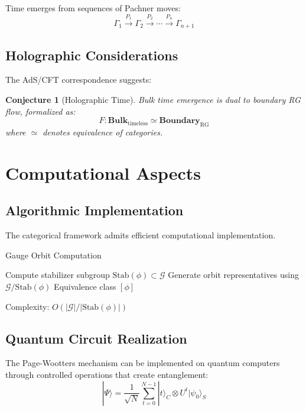 \documentclass[12pt,a4paper]{article}
\newtheorem{conjecture}[theorem]{Conjecture}
\newcommand{\GaugeGroup}{\mathcal{G}}
\newcommand{\Config}{\mathcal{C}}
\begin{document}
Time emerges from sequences of Pachner moves:
\[
\Gamma_1 \xrightarrow{P_1} \Gamma_2 \xrightarrow{P_2} \cdots \xrightarrow{P_n} \Gamma_{n+1}
\]

\subsection{Holographic Considerations}

The AdS/CFT correspondence suggests:

\begin{conjecture}[Holographic Time]
Bulk time emergence is dual to boundary RG flow, formalized as:
\[
F: \mathbf{Bulk}_{\text{timeless}} \simeq \mathbf{Boundary}_{\text{RG}}
\]
where $\simeq$ denotes equivalence of categories.
\end{conjecture}

\section{Computational Aspects}

\subsection{Algorithmic Implementation}

The categorical framework admits efficient computational implementation.

\begin{algorithm}
\caption{Gauge Orbit Computation}
\begin{algorithmic}[1]
\Procedure{GaugeOrbit}{$\phi \in \Config$}
\State Compute stabilizer subgroup $\text{Stab}(\phi) \subset \GaugeGroup$
\State Generate orbit representatives using $\GaugeGroup/\text{Stab}(\phi)$
\State \Return Equivalence class $[\phi]$
\EndProcedure
\end{algorithmic}
\end{algorithm}

Complexity: $O(|\GaugeGroup|/|\text{Stab}(\phi)|)$

\subsection{Quantum Circuit Realization}

The Page-Wootters mechanism can be implemented on quantum computers through controlled operations that create entanglement:
\[
|\Psi\rangle = \frac{1}{\sqrt{N}}\sum_{t=0}^{N-1} |t\rangle_C \otimes U^t|\psi_0\rangle_S
\]
\end{document}
